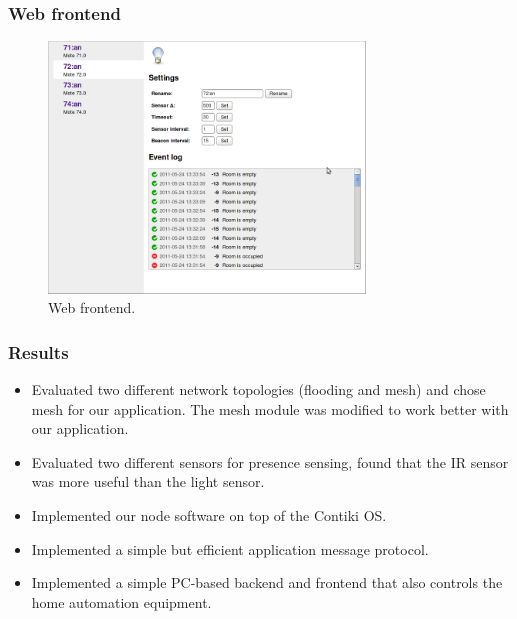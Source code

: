 \documentclass{beamer}
\begin{document}
\begin{frame}
\frametitle{Web frontend}

	\begin{center}
		\begin{figure}
			\includegraphics[width=0.75\textwidth]{webfrontend.png}
			\caption{Web frontend.}
		\end{figure}
	\end{center}

\end{frame}

\begin{frame}
\frametitle{Results}

	\begin{block}
		
		\begin{itemize}\setlength{\itemsep}{4mm}

			\item
              Evaluated two different network topologies (flooding and
              mesh) and chose mesh for our application. The mesh
              module was modified to work better with our application.
			\item
              Evaluated two different sensors for presence sensing,
              found that the IR sensor was more useful than the light
              sensor.
			\item
              Implemented our node software on top of the Contiki OS.
			\item
              Implemented a simple but efficient application message
              protocol.
			\item
              Implemented a simple PC-based backend and frontend that
              also controls the home automation equipment.

		\end{itemize}

	\end{block}

\end{frame}
\end{document}
